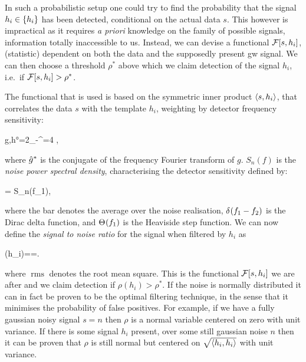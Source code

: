 \documentclass[
  10pt,
  a4paper,
  DIV=11,
  numbers=noendperiod,
  twoside]{scrreprt}
\let\[\relax \let\]\relax %
\DeclareRobustCommand{\[}{\begin{equation}}
\DeclareRobustCommand{\]}{\end{equation}}
\begin{document}
In such a probabilistic setup one could try to find the probability that
the signal \(h_i\in \brk{h_i}\) has been detected, conditional on the
actual data \(s\). This however is impractical as it requires \emph{a
priori} knowledge on the family of possible signals, information totally
inaccessible to us. Instead, we can devise a functional
\(\mathcal{F}\brc{s,h_i}\), (statistic) dependent on both the data and
the supposedly present \gls{gw} signal. We can then choose a threshold
\(\rho^*\) above which we claim detection of the signal \(h_i\), i.e.~if
\(\mathcal{F}\brc{s,h_i}>\rho^*\).

The functional that is used is based on the symmetric inner product
\(\ang{s,h_i}\), that correlates the data \(s\) with the template
\(h_i\), weighting by detector frequency sensitivity:

\[\ang{g,h}=2\int\limits_{-\infty}^{\infty}=4 ,\]

where \(\conj{\ft{g}{2\pi}}\) is the conjugate of the frequency Fourier
transform of \(g\). \(S_n(f)\) is the \emph{noise power spectral
density}, characterising the detector sensitivity defined by:

\[
=\half {} S_n(f_1),
\]

where the bar denotes the average over the noise realisation,
\(\deltafn{f_1-f_2}\) is the Dirac delta function, and \(\thetafn{f_1}\)
is the Heaviside step function. We can now define the \emph{signal to
noise ratio} for the signal when filtered by \(h_i\) as 

\[
\rho (h_i)==.
\]

where \(\operatorname{rms}\) denotes the root mean square. This is the
functional \(\mathcal{F}\brc{s,h_i}\) we are after and we claim
detection if \(\rho(h_i)>\rho^*\). If the noise is normally distributed
it can in fact be proven to be the optimal filtering technique, in the
sense that it minimises the probability of false positives. For example,
if we have a fully gaussian noisy signal \(s=n\) then \(\rho\) is a
normal variable centered on zero with unit variance. If there is some
signal \(h_i\) present, over some still gaussian noise \(n\) then it can
be proven that \(\rho\) is still normal but centered on
\(\sqrt{\ang{h_i,h_i}}\) with unit variance.
\end{document}
